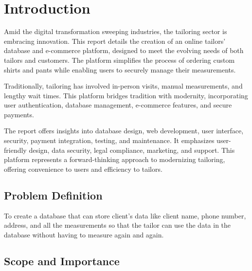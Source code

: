 \documentclass[12pt, letter paper]{report}
\begin{document}
{\chapter{Introduction}
\begin{spacing}{1.5}
Amid the digital transformation sweeping industries, the tailoring sector is embracing innovation. This report details the creation of an online tailors' database and e-commerce platform, designed to meet the evolving needs of both tailors and customers. The platform simplifies the process of ordering custom shirts and pants while enabling users to securely manage their measurements.

Traditionally, tailoring has involved in-person visits, manual measurements, and lengthy wait times. This platform bridges tradition with modernity, incorporating user authentication, database management, e-commerce features, and secure payments.

The report offers insights into database design, web development, user interface, security, payment integration, testing, and maintenance. It emphasizes user-friendly design, data security, legal compliance, marketing, and support. This platform represents a forward-thinking approach to modernizing tailoring, offering convenience to users and efficiency to tailors.
\end{spacing}
\section{Problem Definition} 
\begin{spacing}{1.5}
To create a database that can store client’s data like client name, phone number, address, and all the measurements so that the tailor can use the data in the database without having to measure again and again.
\end{spacing}
\section{Scope and Importance}
}
\end{document}
